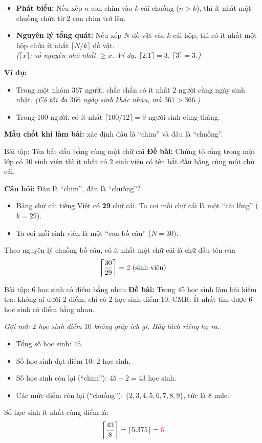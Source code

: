 \documentclass[12pt,a4paper]{article}
\begin{document}
\begin{itemize}
  \item \textbf{Phát biểu:} Nếu xếp $n$ con chim vào $k$ cái chuồng ($n > k$), thì ít nhất một chuồng chứa từ $2$ con chim trở lên.
  \item \textbf{Nguyên lý tổng quát:} Nếu xếp $N$ đồ vật vào $k$ cái hộp, thì có ít nhất một hộp chứa ít nhất $\lceil N/k \rceil$ đồ vật.\\
  \textit{($\lceil x \rceil$: số nguyên nhỏ nhất $\ge x$. Ví dụ: $\lceil 2.1 \rceil = 3$, $\lceil 3 \rceil = 3$.)}
\end{itemize}

\textbf{Ví dụ:}
\begin{itemize}
  \item Trong một nhóm $367$ người, chắc chắn có ít nhất $2$ người cùng ngày sinh nhật. \textit{(Có tối đa $366$ ngày sinh khác nhau, mà $367 > 366$.)}
  \item Trong $100$ người, có ít nhất $\lceil 100/12 \rceil = 9$ người sinh cùng tháng.
\end{itemize}

\textbf{Mấu chốt khi làm bài:} xác định đâu là ``chim'' và đâu là ``chuồng''.

\begin{baitap}{Bài tập: Tên bắt đầu bằng cùng một chữ cái}
\textbf{Đề bài:} Chứng tỏ rằng trong một lớp có $30$ sinh viên thì ít nhất có $2$ sinh viên có tên bắt đầu bằng cùng một chữ cái.

\textbf{Câu hỏi:} Đâu là ``chim'', đâu là ``chuồng''?
\begin{itemize}
  \item Bảng chữ cái tiếng Việt có \textbf{29} chữ cái. Ta coi mỗi chữ cái là một ``cái lồng'' ($k = 29$).
  \item Ta coi mỗi sinh viên là một ``con bồ câu'' ($N = 30$).
\end{itemize}
Theo nguyên lý chuồng bồ câu, có ít nhất một chữ cái là chữ đầu tên của
\[
  \left\lceil \frac{30}{29} \right\rceil = \textcolor{AccentRed}{2}\text{ (sinh viên)}
\]
\end{baitap}

\begin{baitap}{Bài tập: 6 học sinh có điểm bằng nhau}
\textbf{Đề bài:} Trong $45$ học sinh làm bài kiểm tra: không ai dưới $2$ điểm, chỉ có $2$ học sinh điểm $10$. CMR: Ít nhất tìm được $6$ học sinh có điểm bằng nhau.

\textit{Gợi mở: $2$ học sinh điểm $10$ không giúp ích gì. Hãy tách riêng họ ra.}
\begin{itemize}
  \item Tổng số học sinh: $45$.
  \item Số học sinh đạt điểm $10$: $2$ học sinh.
  \item Số học sinh còn lại (``chim''): $45 - 2 = 43$ học sinh.
  \item Các mức điểm còn lại (``chuồng''): $\{2, 3, 4, 5, 6, 7, 8, 9\}$, tức là $8$ mức.
\end{itemize}
Số học sinh ít nhất cùng điểm là:
\[
  \left\lceil \frac{43}{8} \right\rceil = \lceil 5.375 \rceil = \textcolor{AccentRed}{6}
\]
\end{baitap}
\end{document}
